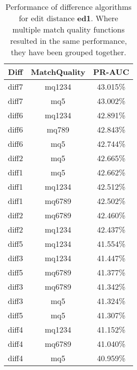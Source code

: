 \begin{table}[tbph]
\begin{center}
\begin{tabular}{|c|c||c|}
\hline
Diff & MatchQuality & PR-AUC  \\
\hline
\hline
diff7 & mq1234 & 43.015\% \\
diff7 & mq5 & 43.002\% \\
diff6 & mq1234 & 42.891\% \\
diff6 & mq789 & 42.843\% \\
diff6 & mq5 & 42.744\% \\
diff2 & mq5 & 42.665\% \\
diff1 & mq5 & 42.662\% \\
diff1 & mq1234 & 42.512\% \\
diff1 & mq6789 & 42.502\% \\
diff2 & mq6789 & 42.460\% \\
diff2 & mq1234 & 42.437\% \\
diff5 & mq1234 & 41.554\% \\
diff3 & mq1234 & 41.447\% \\
diff5 & mq6789 & 41.377\% \\
diff3 & mq6789 & 41.342\% \\
diff3 & mq5 & 41.324\% \\
diff5 & mq5 & 41.307\% \\
diff4 & mq1234 & 41.152\% \\
diff4 & mq6789 & 41.040\% \\
diff4 & mq5 & 40.959\% \\
\hline
\end{tabular}
\end{center}
\caption{Performance of difference algorithms for
  edit distance \textbf{ed1}.  Where multiple match
  quality functions resulted in the same performance, they
  have been grouped together.}
\label{tab:editlongbyed1}
\end{table}
